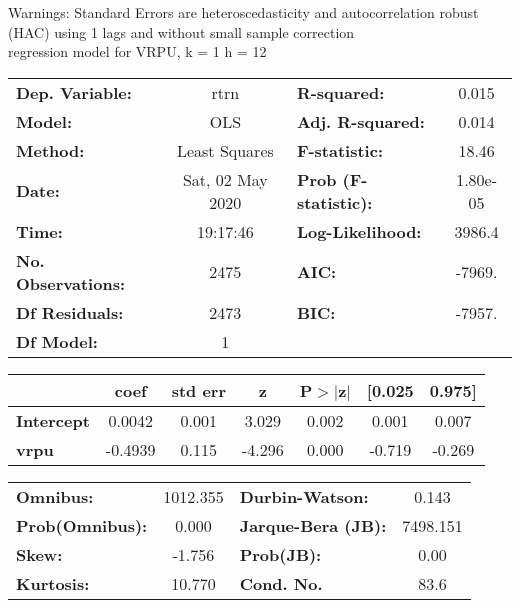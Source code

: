 Warnings: \newline
 [1] Standard Errors are heteroscedasticity and autocorrelation robust (HAC) using 1 lags and without small sample correction\\ 

regression model for VRPU, k = 1 h = 12\begin{center}
\begin{tabular}{lclc}
\toprule
\textbf{Dep. Variable:}    &       rtrn       & \textbf{  R-squared:         } &     0.015   \\
\textbf{Model:}            &       OLS        & \textbf{  Adj. R-squared:    } &     0.014   \\
\textbf{Method:}           &  Least Squares   & \textbf{  F-statistic:       } &     18.46   \\
\textbf{Date:}             & Sat, 02 May 2020 & \textbf{  Prob (F-statistic):} &  1.80e-05   \\
\textbf{Time:}             &     19:17:46     & \textbf{  Log-Likelihood:    } &    3986.4   \\
\textbf{No. Observations:} &        2475      & \textbf{  AIC:               } &    -7969.   \\
\textbf{Df Residuals:}     &        2473      & \textbf{  BIC:               } &    -7957.   \\
\textbf{Df Model:}         &           1      & \textbf{                     } &             \\
\bottomrule
\end{tabular}
\begin{tabular}{lcccccc}
                   & \textbf{coef} & \textbf{std err} & \textbf{z} & \textbf{P$> |$z$|$} & \textbf{[0.025} & \textbf{0.975]}  \\
\midrule
\textbf{Intercept} &       0.0042  &        0.001     &     3.029  &         0.002        &        0.001    &        0.007     \\
\textbf{vrpu}      &      -0.4939  &        0.115     &    -4.296  &         0.000        &       -0.719    &       -0.269     \\
\bottomrule
\end{tabular}
\begin{tabular}{lclc}
\textbf{Omnibus:}       & 1012.355 & \textbf{  Durbin-Watson:     } &    0.143  \\
\textbf{Prob(Omnibus):} &   0.000  & \textbf{  Jarque-Bera (JB):  } & 7498.151  \\
\textbf{Skew:}          &  -1.756  & \textbf{  Prob(JB):          } &     0.00  \\
\textbf{Kurtosis:}      &  10.770  & \textbf{  Cond. No.          } &     83.6  \\
\bottomrule
\end{tabular}
\end{center}

